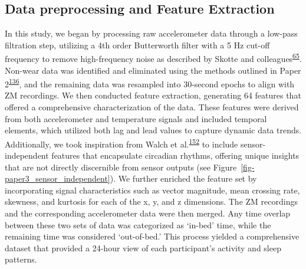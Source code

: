 \documentclass[
  10pt,
]{scrbook}
\begin{document}
\hypertarget{data-preprocessing-and-feature-extraction}{%
\subsection{Data preprocessing and Feature
Extraction}\label{data-preprocessing-and-feature-extraction}}

In this study, we began by processing raw accelerometer data through a
low-pass filtration step, utilizing a 4th order Butterworth filter with
a 5 Hz cut-off frequency to remove high-frequency noise as described by
Skotte and
colleagues\textsuperscript{\protect\hyperlink{ref-skotte_detection_2014}{65}}.
Non-wear data was identified and eliminated using the methods outlined
in Paper
2\textsuperscript{\protect\hyperlink{ref-skovgaard_generalizability_2023}{136}},
and the remaining data was resampled into 30-second epochs to align with
ZM recordings. We then conducted feature extraction, generating 64
features that offered a comprehensive characterization of the data.
These features were derived from both accelerometer and temperature
signals and included temporal elements, which utilized both lag and lead
values to capture dynamic data trends. Additionally, we took inspiration
from Walch et
al.\textsuperscript{\protect\hyperlink{ref-walch_sleep_2019}{152}} to
include sensor-independent features that encapsulate circadian rhythms,
offering unique insights that are not directly discernible from sensor
outputs (see Figure~\ref{fig-paper3_sensor_independent}). We further
enriched the feature set by incorporating signal characteristics such as
vector magnitude, mean crossing rate, skewness, and kurtosis for each of
the x, y, and z dimensions. The ZM recordings and the corresponding
accelerometer data were then merged. Any time overlap between these two
sets of data was categorized as `in-bed' time, while the remaining time
was considered `out-of-bed.' This process yielded a comprehensive
dataset that provided a 24-hour view of each participant's activity and
sleep patterns.
\end{document}
